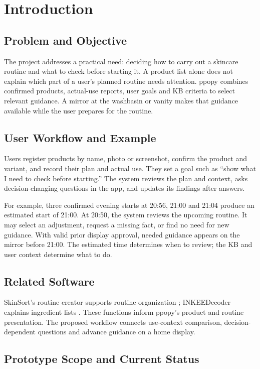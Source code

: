 \documentclass[conference,letterpaper]{IEEEtran}
\begin{document}
\section{Introduction}

\subsection{Problem and Objective}

The project addresses a practical need: deciding how to carry out a skincare routine and what to check before starting it. A product list alone does not explain which part of a user's planned routine needs attention. ppopy combines confirmed products, actual-use reports, user goals and KB criteria to select relevant guidance. A mirror at the washbasin or vanity makes that guidance available while the user prepares for the routine.

\subsection{User Workflow and Example}

Users register products by name, photo or screenshot, confirm the product and variant, and record their plan and actual use. They set a goal such as ``show what I need to check before starting.'' The system reviews the plan and context, asks decision-changing questions in the app, and updates its findings after answers.

For example, three confirmed evening starts at 20:56, 21:00 and 21:04 produce an estimated start of 21:00. At 20:50, the system reviews the upcoming routine. It may select an adjustment, request a missing fact, or find no need for new guidance. With valid prior display approval, needed guidance appears on the mirror before 21:00. The estimated time determines when to review; the KB and user context determine what to do.

\subsection{Related Software}

SkinSort's routine creator supports routine organization \cite{ref1}; INKEEDecoder explains ingredient lists \cite{ref2}. These functions inform ppopy's product and routine presentation. The proposed workflow connects use-context comparison, decision-dependent questions and advance guidance on a home display.

\subsection{Prototype Scope and Current Status}
\end{document}
